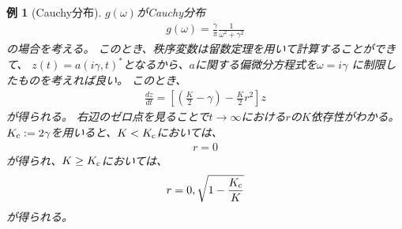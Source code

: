 \documentclass{jsarticle}
\newtheorem{eg}{例}
\begin{document}
\begin{eg}[Cauchy分布]
$g(\omega)$がCauchy分布
\begin{align}
g(\omega)=\frac{\gamma}{\pi}\frac{1}{\omega^{2}+\gamma^{2}}
\end{align}
の場合を考える。
このとき、秩序変数は留数定理を用いて計算することができて、
$z(t)=a(i\gamma,t)^{*}$となるから、$a$に関する偏微分方程式を$\omega=i\gamma$
に制限したものを考えれば良い。
このとき、
\begin{align}
\frac{dz}{dt}=\left[\left(\frac{K}{2}-\gamma\right)-\frac{K}{2}r^{2}\right]z
\end{align}
が得られる。
右辺のゼロ点を見ることで$t\to\infty$における$r$の$K$依存性がわかる。
$K_{\rm c}:=2\gamma$を用いると、$K<K_{\rm c}$においては、
\begin{align}
r=0
\end{align}
が得られ、$K\geq K_{\rm c}$においては、
\begin{align}
r=0,\sqrt{1-\frac{K_{\rm c}}{K}}
\end{align}
が得られる。
\end{eg}



\end{document}
